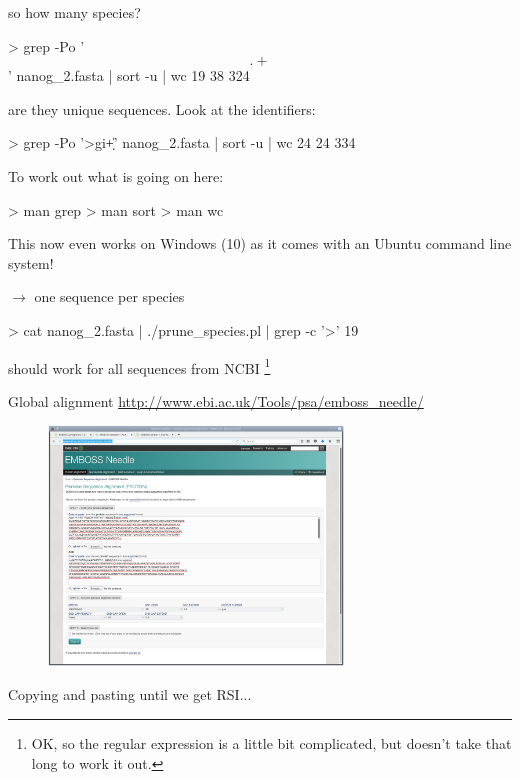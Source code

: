 \documentclass[pdf]{beamer}
\newcommand\blfootnote[1]{%
  \begingroup  %
  \renewcommand\thefootnote{}\footnote{#1}%
  \addtocounter{footnote}{-1}  %
  \endgroup
}
\begin{document}
\begin{frame}[fragile]{so how many species?}
  \begin{consolecode}
    > grep -Po '\[.+\]' nanog_2.fasta | sort -u | wc
     19      38     324
  \end{consolecode}
  
  are they unique sequences. Look at the identifiers:
  \begin{consolecode}
    > grep -Po '>gi\|\d+' nanog_2.fasta | sort -u | wc
     24      24     334
  \end{consolecode}

  \pause
  To work out what is going on here:
  \begin{consolecode}
    > man grep
    > man sort
    > man wc
  \end{consolecode}

  This now even works on Windows (10) as it comes with an Ubuntu command line system!
\end{frame}

\begin{frame}[fragile]{$\rightarrow$ one sequence per species}

  \begin{consolecode}
    > cat nanog_2.fasta | ./prune_species.pl | grep -c '>'
    19
  \end{consolecode}
  \small should work for all sequences from NCBI
  \blfootnote{OK, so the regular expression is a little bit complicated, but
    doesn't take that long to work it out.}
\end{frame}

\begin{frame}{Global alignment}
  \url{http://www.ebi.ac.uk/Tools/psa/emboss_needle/}
  \begin{figure}[ht]
    \includegraphics[width=0.7\textwidth]{images/emboss_needle}
  \end{figure}
  \tiny Copying and pasting until we get RSI...
\end{frame}
\end{document}
